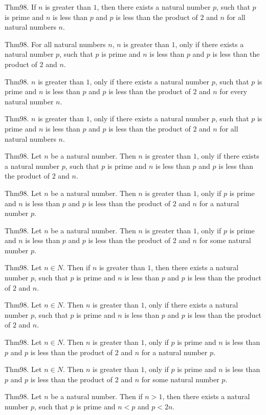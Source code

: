 \documentclass{article}
\begin{document}
Thm98. If $n$ is greater than $1$, then there exists a natural number $p$, such that $p$ is prime and $n$ is less than $p$ and $p$ is less than the product of $2$ and $n$ for all natural numbers $n$.

Thm98. For all natural numbers $n$, $n$ is greater than $1$, only if there exists a natural number $p$, such that $p$ is prime and $n$ is less than $p$ and $p$ is less than the product of $2$ and $n$.

Thm98. $n$ is greater than $1$, only if there exists a natural number $p$, such that $p$ is prime and $n$ is less than $p$ and $p$ is less than the product of $2$ and $n$ for every natural number $n$.

Thm98. $n$ is greater than $1$, only if there exists a natural number $p$, such that $p$ is prime and $n$ is less than $p$ and $p$ is less than the product of $2$ and $n$ for all natural numbers $n$.

Thm98. Let $n$ be a natural number. Then $n$ is greater than $1$, only if there exists a natural number $p$, such that $p$ is prime and $n$ is less than $p$ and $p$ is less than the product of $2$ and $n$.

Thm98. Let $n$ be a natural number. Then $n$ is greater than $1$, only if $p$ is prime and $n$ is less than $p$ and $p$ is less than the product of $2$ and $n$ for a natural number $p$.

Thm98. Let $n$ be a natural number. Then $n$ is greater than $1$, only if $p$ is prime and $n$ is less than $p$ and $p$ is less than the product of $2$ and $n$ for some natural number $p$.

Thm98. Let $n \in N$. Then if $n$ is greater than $1$, then there exists a natural number $p$, such that $p$ is prime and $n$ is less than $p$ and $p$ is less than the product of $2$ and $n$.

Thm98. Let $n \in N$. Then $n$ is greater than $1$, only if there exists a natural number $p$, such that $p$ is prime and $n$ is less than $p$ and $p$ is less than the product of $2$ and $n$.

Thm98. Let $n \in N$. Then $n$ is greater than $1$, only if $p$ is prime and $n$ is less than $p$ and $p$ is less than the product of $2$ and $n$ for a natural number $p$.

Thm98. Let $n \in N$. Then $n$ is greater than $1$, only if $p$ is prime and $n$ is less than $p$ and $p$ is less than the product of $2$ and $n$ for some natural number $p$.

Thm98. Let $n$ be a natural number. Then if $n > 1$, then there exists a natural number $p$, such that $p$ is prime and $n < p$ and $p < 2 n$.
\end{document}
